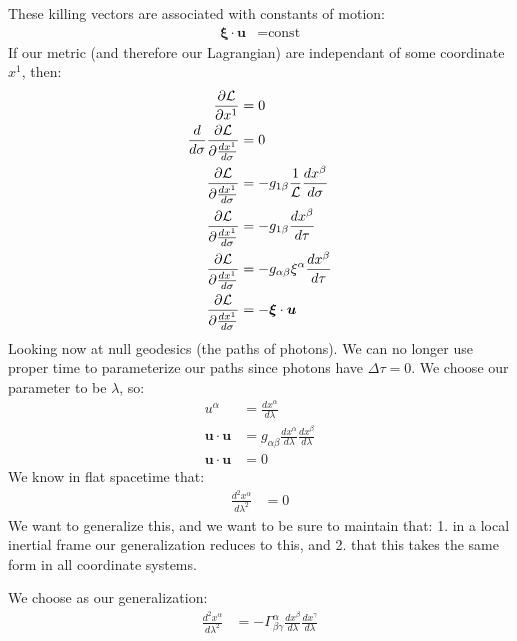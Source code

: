 These killing vectors are associated with constants of motion: 
\begin{align*}
	\bm{\xi}\cdot\bm{u} &= \text{const}
\end{align*}
If our metric (and therefore our Lagrangian) are independant of some coordinate $x^1$, then:
\begin{align*}
	\frac{\partial \mathcal{L}}{\partial x^1} &=0 \\
	\frac{d}{d\sigma} \frac{\partial \mathcal{L}}{\partial \frac{dx^1}{d\sigma}} &= 0 \\
	\frac{\partial \mathcal{L}}{\partial \frac{dx^1}{d\sigma}} &= -g_{1\beta} \frac{1}{\mathcal{L}} \frac{dx^\beta}{d\sigma} \\
	\frac{\partial \mathcal{L}}{\partial \frac{dx^1}{d\sigma}} &= -g_{1\beta} \frac{dx^\beta}{d\tau} \\
	\frac{\partial \mathcal{L}}{\partial \frac{dx^1}{d\sigma}} &= -g_{\alpha\beta} \xi^\alpha\frac{dx^\beta}{d\tau} \\
	\frac{\partial \mathcal{L}}{\partial \frac{dx^1}{d\sigma}} &= -\bm{\xi}\cdot\bm{u}
\end{align*}
Looking now at null geodesics (the paths of photons). We can no longer use proper time to parameterize our paths since photons have $\Delta\tau = 0$. We choose our parameter to be $\lambda$, so:
\begin{align*}
	u^\alpha &= \frac{dx^\alpha}{d\lambda} \\
	\bm{u}\cdot\bm{u} &= g_{\alpha\beta} \frac{dx^\alpha}{d\lambda} \frac{dx^\beta}{d\lambda} \\
	\bm{u}\cdot\bm{u} &= 0
\end{align*}
We know in flat spacetime that:
\begin{align*}
	\frac{d^2x^\alpha}{d\lambda^2} &= 0
\end{align*}
We want to generalize this, and we want to be sure to maintain that: 1. in a local inertial frame our generalization reduces to this, and 2. that this takes the same form in all coordinate systems.

We choose as our generalization:
\begin{align*}
	\frac{d^2x^\alpha}{d\lambda^2} &= -\Gamma^\alpha_{\beta\gamma} \frac{dx^\beta}{d\lambda}\frac{dx^\gamma}{d\lambda}
\end{align*}

